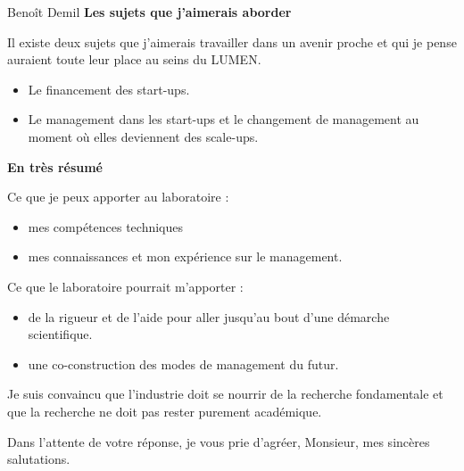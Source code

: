 \documentclass{lettre}
\begin{document}
\begin{letter}{ Benoît Demil }
    \textbf{Les sujets que j'aimerais aborder}

    Il existe deux sujets que j'aimerais travailler dans un avenir proche et qui je pense auraient toute leur place au seins du LUMEN.

    \begin{itemize}
        \item Le financement des start-ups.
        \item Le management dans les start-ups et le changement de management au moment où elles deviennent des scale-ups.
    \end{itemize}

    \textbf{En très résumé}

    Ce que je peux apporter au laboratoire :
    \begin{itemize}
        \item mes compétences techniques
        \item mes connaissances et mon expérience sur le management.
    \end{itemize}

    Ce que le laboratoire pourrait m'apporter :
    \begin{itemize}
        \item de la rigueur et de l'aide pour aller jusqu'au bout d'une démarche scientifique.
        \item une co-construction des modes de management du futur.
    \end{itemize}

    Je suis convaincu que l'industrie doit se nourrir de la recherche fondamentale et que la recherche ne doit pas rester purement académique.

    \closing{Dans l'attente de votre réponse, je vous prie d’agréer, Monsieur, mes sincères salutations.}

\end{letter}
\end{document}
